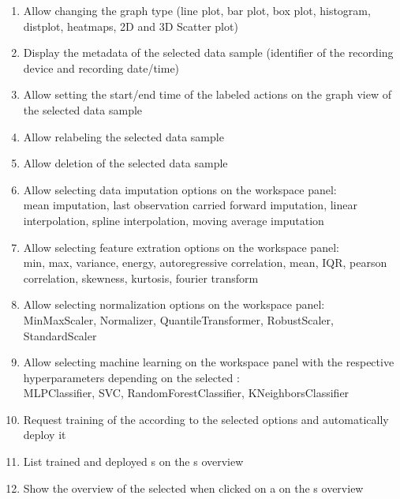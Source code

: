 \begin{enumerate}[{label = \textbf{/F{\protect\twodigits{\arabic{enumi}}}0/}, leftmargin = *}]
    \item \label{itm:change-graph}Allow changing the graph type (line plot, bar plot, box plot, histogram, distplot, heatmaps, 2D and 3D Scatter plot)
    \item \label{itm:metadata}Display the \gls{metadata} of the selected \gls{data sample} (identifier of the recording device and recording date/time)
    \item \label{itm:set-timeframe}Allow setting the start/end time of the labeled actions on the graph view of the selected \gls{data sample}
    \item \label{itm:relabel}Allow relabeling the selected \gls{data sample}
    \item \label{itm:delete-sample}Allow deletion of the selected \gls{data sample}
    \item \label{itm:imputation}Allow selecting data imputation options on the \gls{workspace} panel: \\\gls{mean imputation}, \gls{last observation carried forward imputation}, \gls{linear interpolation}, \gls{spline interpolation}, \gls{moving average imputation}
    \item \label{itm:feature-extraction}Allow selecting feature extration options on the \gls{workspace} panel: \\min, max, variance, energy, \gls{autoregressive correlation}, mean, \gls{IQR}, \gls{pearson correlation}, skewness, kurtosis, fourier transform
    \item \label{itm:normalization}Allow selecting normalization options on the \gls{workspace} panel: \\\gls{MinMaxScaler}, \gls{Normalizer}, \gls{QuantileTransformer}, \gls{RobustScaler}, \gls{StandardScaler}
    \item \label{itm:model-hyperparameters}Allow selecting machine learning  on the \gls{workspace} panel with the respective hyperparameters depending on the selected : \\\gls{MLPClassifier}, \gls{SVC}, \gls{RandomForestClassifier}, \gls{KNeighborsClassifier}
    \item \label{itm:train}Request training of the  according to the selected options and automatically deploy it
    \item \label{itm:models-over-list}List trained and deployed s on the s overview
    \item \label{itm:models-over-over}Show the overview of the selected  when clicked on a  on the s overview

\end{enumerate}
